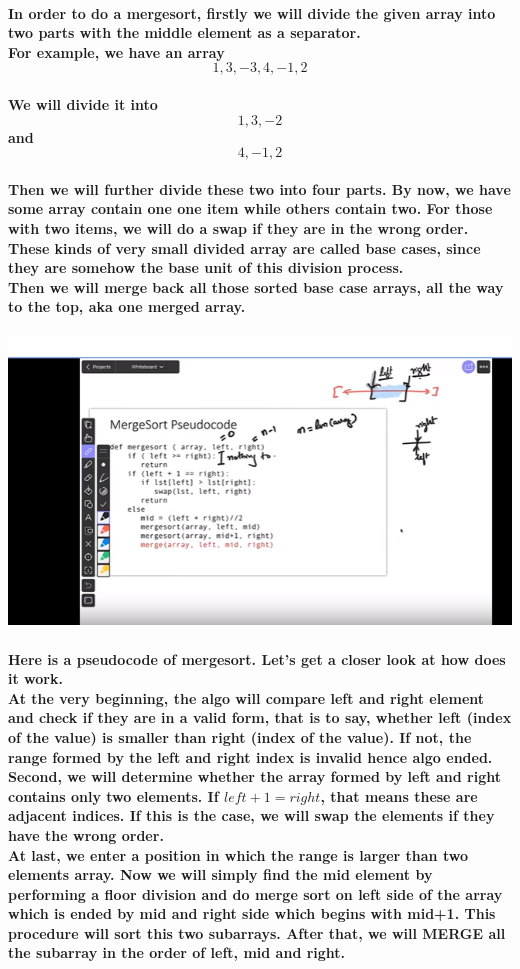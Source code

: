 \documentclass{article}
\begin{document}
\paragraph{In order to do a mergesort, firstly we will divide the given array into two parts with the middle element as a separator.\\
For example, we have an array \[1,3,-3,4,-1,2\]\\ We will divide it into \[1,3,-2\] and \[4,-1,2\]\\
Then we will further divide these two into four parts. By now, we have some array contain one one item while others contain two. For those with two items, we will do a swap if they are in the wrong order.\\
These kinds of very small divided array are called base cases, since they are somehow the base unit of this division process.\\
Then we will merge back all those sorted base case arrays, all the way to the top, aka one merged array.\\}


\includegraphics[width=\textwidth]{mergesortpseudocode}


\paragraph{Here is a pseudocode of mergesort. Let's get a closer look at how does it work.\\
At the very beginning, the algo will compare left and right element and check if they are in a valid form, that is to say, whether left (index of the value) is smaller than right (index of the value). If not, the range formed by the left and right index is invalid hence algo ended.\\
Second, we will determine whether the array formed by left and right contains only two elements. If $left + 1 = right$, that means these are adjacent indices. If this is the case, we will swap the elements if they have the wrong order.\\
At last, we enter a position in which the range is larger than two elements array. Now we will simply find the mid element by performing a floor division and do merge sort on left side of the array which is ended by mid and right side which begins with mid+1. 
This procedure will sort this two subarrays. After that, we will MERGE all the subarray in the order of left, mid and right.\\}
\end{document}
